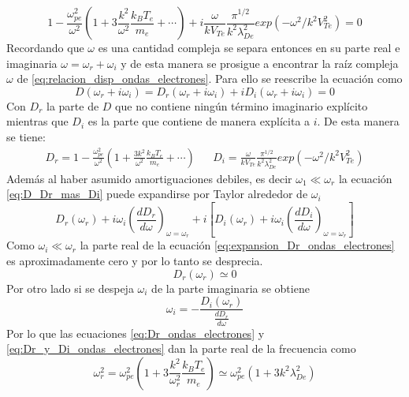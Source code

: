 \documentclass[../tesis_main_file.tex]{subfiles}
\begin{document}
\begin{equation}
\label{eq:relacion_disp_ondas_electrones}
1- \frac{\omega^2_{pe}}{\omega^2}\left(1+3\frac{k^2}{\omega^2}\frac{k_BT_{e}}{m_{e}}+\cdots \right)+i\frac{\omega}{kV_{Te}}\frac{\pi^{1/2}}{k^2\lambda^2_{De}}exp(-\omega^2/k^2V^2_{Te}) =0
\end{equation}
Recordando que $\omega$ es una cantidad compleja se separa entonces en su parte real e imaginaria $\omega =\omega_r +\omega_i$ y de esta manera se prosigue a encontrar la raíz compleja $\omega$ de \ref{eq:relacion_disp_ondas_electrones}.
Para ello se reescribe la ecuación como
\begin{equation}
\label{eq:D_Dr_mas_Di}
D(\omega_r + i\omega_i) = D_r(\omega_r + i\omega_i)+iD_i(\omega_r + i\omega_i)=0
\end{equation}
Con $D_r$ la parte de $D$ que no contiene ningún término imaginario explícito mientras que $D_i$ es la parte que contiene de manera explícita a $i$. De esta manera se tiene:
\begin{align}
\label{eq:Dr_y_Di_ondas_electrones}
D_r =1-\frac{\omega^2_{pe}}{\omega^2}\left(1+\frac{3k^2}{\omega^2}\frac{k_BT_e}{m_e}+\cdots\right)&&D_i=\frac{\omega}{kV_{Te}}\frac{\pi^{1/2}}{k^2\lambda^2_{De}}exp(-\omega^2/k^2V^2_{Te})
\end{align}
Además al haber asumido amortiguaciones debiles, es decir $\omega_1 \ll \omega_r$ la ecuación \ref{eq:D_Dr_mas_Di} puede expandirse por Taylor alrededor de $\omega_i$
\begin{equation}
\label{eq:expansion_Dr_ondas_electrones}
D_r(\omega_r)+i\omega_i \left(\frac{dD_r}{d\omega}\right)_{\omega=\omega_r} + i\left[D_i(\omega_r)+i\omega_i\left(\frac{dD_i}{d\omega}\right)_{\omega=\omega_r}\right]
\end{equation}
Como $\omega_i \ll \omega_r$ la parte real de la ecuación \ref{eq:expansion_Dr_ondas_electrones} es aproximadamente cero y por lo tanto se desprecia.
\begin{equation}
\label{eq:Dr_ondas_electrones}
D_r(\omega_r)\simeq 0
\end{equation}
Por otro lado si se despeja $\omega_i$ de la parte imaginaria se obtiene
\begin{equation}
\label{eq:despeje_parte_im_ondas_electrones}
\omega_i=-\frac{D_i(\omega_r)}{\frac{dD_r}{d\omega}}
\end{equation}
Por lo que las ecuaciones \ref{eq:Dr_ondas_electrones} y \ref{eq:Dr_y_Di_ondas_electrones} dan la parte real de la frecuencia como
\begin{equation}
\label{eq:wr_ondas_electrones}
\omega^2_r=\omega^2_{pe}\left(1+3\frac{k^2}{\omega^2_r}\frac{k_BT_e}{m_e}\right)\simeq\omega^2_{pe}\left(1+3k^2\lambda^2_{De}\right)
\end{equation}
\end{document}

